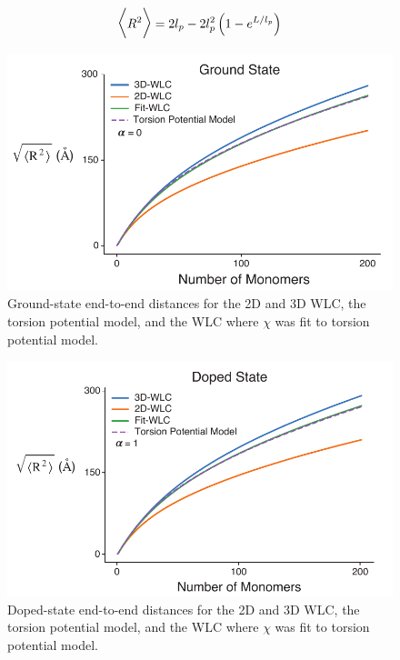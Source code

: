\begin{equation}
\Large
\Big\langle R^2 \Big\rangle = 2l_p - 2l_p^2 \left(1 - e^{L/l_p} \right)
\label{eq:wlc_msqr}
\end{equation}

\begin{figure}[hbt!]
    \centering
    \includegraphics{figures/append_tor_model/gs_wlc_fit.pdf}
    \caption{Ground-state end-to-end distances for the 2D and 3D WLC, the torsion potential model, and the WLC where $\chi$ was fit to torsion potential model.}
    \label{fig:gs_wlc}
\end{figure}

\begin{figure}[hbt!]
    \centering
    \includegraphics{figures/append_tor_model/cat_wlc_fit.pdf}
    \caption{Doped-state end-to-end distances for the 2D and 3D WLC, the torsion potential model, and the WLC where $\chi$ was fit to torsion potential model.}
    \label{fig:d_wlc}
\end{figure}

